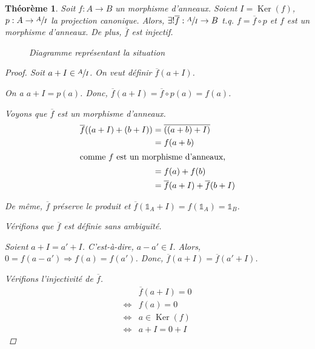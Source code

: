 \documentclass{report}
\newtheorem*{thm}{Th\'eor\`eme}
\theoremstyle{definition}
\theoremstyle{remark}
\def\id{\mathds{1}}
\def\noyau{\operatorname{Ker}}
\begin{document}
	\begin{thm}
		Soit $f:A\to B$ un morphisme d'anneaux. Soient $I=\noyau(f)$, $p:A\to\sfrac{A}{I}$ la projection canonique. Alors, $\exists!\overline{f}:\sfrac{A}{I}\to B$ t.q. $f=\overline{f}\circ p$ et $f$ est un morphisme d'anneaux. De plus, $\overline{f}$ est injectif.

		\begin{figure}[h]
			\centering
			\caption{Diagramme repr\'esentant la situation}
		\end{figure}

		\begin{proof}
			Soit $a+I\in\sfrac{A}{I}$. On veut d\'efinir $\overline{f}(a+I)$.

			On a $a+I=p(a)$. Donc, $\overline{f}(a+I) = \overline{f}\circ p(a) = f(a)$.

			Voyons que $\overline{f}$ est un morphisme d'anneaux.
			\begin{align*}
				\overline{f}((a+I)+(b+I))&= \overline{((a+b)+I)}\\
				&= f(a+b)\\
				\shortintertext{comme $f$ est un morphisme d'anneaux,}
				&= f(a)+f(b)\\
				&= \overline{f}(a+I)+\overline{f}(b+I)
			\end{align*}

			De m\^eme, $\overline{f}$ pr\'eserve le produit et $\overline{f}(\id_A+I)=f(\id_A)=\id_B$.

			V\'erifions que $\overline{f}$ est d\'efinie sans ambigu\"it\'e.

			Soient $a+I=a'+I$. C'est-\`a-dire, $a-a'\in I$. Alors, $0=f(a-a') \Longrightarrow f(a)=f(a')$. Donc, $\overline{f}(a+I)=\overline{f}(a'+I)$.

			V\'erifions l'injectivit\'e de $\overline{f}$.
			\begin{align*}
				&\overline{f}(a+I)=0\\
				\Longleftrightarrow&f(a)=0\\
				\Longleftrightarrow&a\in \noyau(f)\\
				\Longleftrightarrow&a+I=0+I
			\end{align*}
		\end{proof}
	\end{thm}
\end{document}
